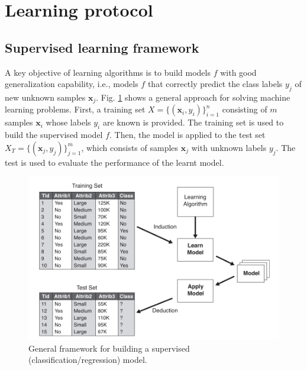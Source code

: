 \section{Learning protocol}
\subsection{Supervised learning framework}

A key objective of learning algorithms is to build models $f$ with good generalization capability, i.e., models $f$ that correctly predict the class labels $y_j$ of new unknown samples $\textbf{x}_j$. Fig. \ref{fig:LearningFramework} shows a general approach for solving machine learning problems. First, a training set $X=\{(\textbf{x}_i,y_i)\}_{i=1}^n$ consisting of $m$ samples $\textbf{x}_i$ whose labels $y_i$ are known is provided. The training set is used to build the supervised model $f$. Then, the model is applied to the test set $X_T=\{(\textbf{x}_j,y_j)\}_{j=1}^m$, which consists of samples $\textbf{x}_j$ with unknown labels $y_j$. The test is used to evaluate the performance of the learnt model. 

\begin{figure}[h!]
\centering
\includegraphics[width=0.7\linewidth]{images/LearningFramework}
\caption{General framework for building a supervised (classification/regression) model.}
\label{fig:LearningFramework}
\end{figure}

